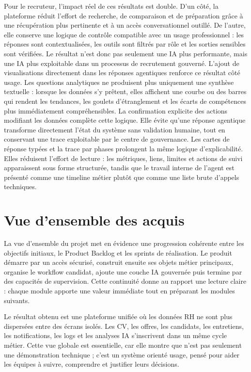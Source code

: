 Pour le recruteur, l'impact réel de ces résultats est double. D'un côté, la plateforme réduit l'effort de recherche, de comparaison et de préparation grâce à une récupération plus pertinente et à un accès conversationnel outillé. De l'autre, elle conserve une logique de contrôle compatible avec un usage professionnel : les réponses sont contextualisées, les outils sont filtrés par rôle et les sorties sensibles sont vérifiées. Le résultat n'est donc pas seulement une IA plus performante, mais une IA plus exploitable dans un processus de recrutement gouverné.
L'ajout de visualisations directement dans les réponses agentiques renforce ce résultat côté usage. Les questions analytiques ne produisent plus uniquement une synthèse textuelle : lorsque les données s'y prêtent, elles affichent une courbe ou des barres qui rendent les tendances, les goulets d'étranglement et les écarts de compétences plus immédiatement compréhensibles.
La confirmation explicite des actions modifiant les données complète cette logique. Elle évite qu'une réponse agentique transforme directement l'état du système sans validation humaine, tout en conservant une trace exploitable par le centre de gouvernance.
Les cartes de réponse typées et la trace par phases prolongent la même logique d'explicabilité. Elles réduisent l'effort de lecture : les métriques, liens, limites et actions de suivi apparaissent sous forme structurée, tandis que le travail interne de l'agent est présenté comme une timeline métier plutôt que comme une liste brute d'appels techniques.

\section*{Vue d'ensemble des acquis}
La vue d'ensemble du projet met en évidence une progression cohérente entre les objectifs initiaux, le Product Backlog et les sprints de réalisation. Le produit démarre par un accès sécurisé, construit ensuite ses objets métier principaux, organise le workflow candidat, ajoute une couche IA gouvernée puis termine par des capacités de supervision. Cette continuité donne au rapport une lecture claire : chaque module apporte une valeur immédiate tout en préparant les modules suivants.

Le résultat obtenu est une plateforme unifiée où les données RH ne sont plus dispersées entre des écrans isolés. Les CV, les offres, les candidats, les entretiens, les notifications, les logs et les analyses IA s'inscrivent dans un même cycle métier. Cette vue globale est essentielle, car elle montre que \projectname{} n'est pas seulement une démonstration technique ; c'est un système orienté usage, pensé pour aider les équipes à suivre, comprendre et justifier leurs décisions.

